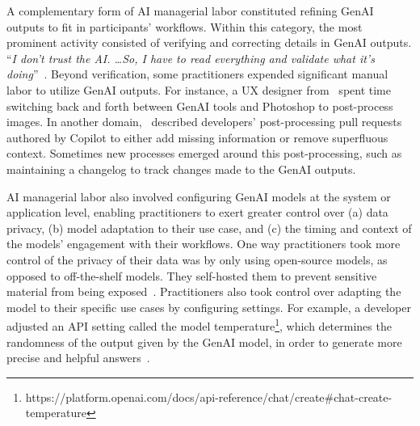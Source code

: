 

A complementary form of AI managerial labor constituted refining GenAI outputs to fit in participants' workflows. Within this category, the most prominent activity consisted of verifying and correcting details in GenAI outputs. ``\textit{I don't trust the AI. \dots So, I have to read everything and validate what it's doing}''~\cite{15}. Beyond verification, some practitioners expended significant manual labor to utilize GenAI outputs. For instance, a UX designer from~\cite{2} spent time switching back and forth between GenAI tools and Photoshop to post-process images. In another domain,~\cite{17} described developers' post-processing pull requests authored by Copilot to either add missing information or remove superfluous context. Sometimes new processes emerged around this post-processing, such as maintaining a changelog to track changes made to the GenAI outputs. 


AI managerial labor also involved configuring GenAI models at the system or application level, enabling practitioners to exert greater control over (a) data privacy, (b) model adaptation to their use case, and (c) the timing and context of the models' engagement with their workflows. One way practitioners took more control of the privacy of their data was by only using open-source models, as opposed to off-the-shelf models. They self-hosted them to prevent sensitive material from being exposed~\cite{1}. Practitioners also took control over adapting the model to their specific use cases by configuring settings. For example, a developer adjusted an API setting called the model temperature\footnote{https://platform.openai.com/docs/api-reference/chat/create\#chat-create-temperature}, which determines the randomness of the output given by the GenAI model, in order to generate more precise and helpful answers~\cite{6}.

